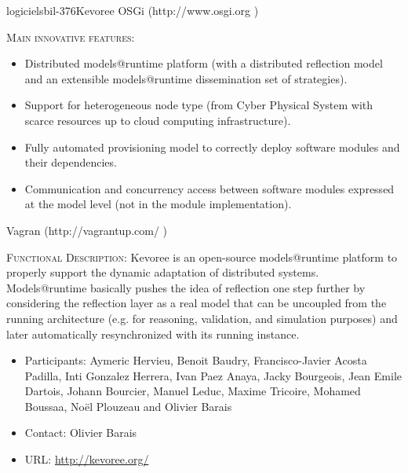\documentclass{ra2018}
\begin{document}
\begin{module}{logiciels}{bil-376}{Kevoree}
    OSGi (http://www.osgi.org )

\textsc{Main innovative features:}
\begin{itemize}
	\item Distributed models@runtime platform (with a distributed reflection model and an extensible models@runtime dissemination set of strategies).
	\item Support for heterogeneous node type (from Cyber Physical System with scarce resources up to cloud computing infrastructure).
	\item Fully automated provisioning model to correctly deploy software modules and their dependencies.
	\item Communication and concurrency access between software modules expressed at the model level (not in the module implementation).
\end{itemize}

    Vagran (http://vagrantup.com/ )


 \textsc{Functional Description:}  Kevoree is an open-source models@runtime platform to properly support the dynamic adaptation of distributed systems. Models@runtime basically pushes the idea of reflection one step further by considering the reflection layer as a real model that can be uncoupled from the running architecture (e.g. for reasoning, validation, and simulation purposes) and later automatically resynchronized with its running instance.\\

   \begin{itemize}
      \item Participants: Aymeric Hervieu, Benoit Baudry, Francisco-Javier Acosta Padilla, Inti Gonzalez Herrera, Ivan Paez Anaya, Jacky Bourgeois, Jean Emile Dartois, Johann Bourcier, Manuel Leduc, Maxime Tricoire, Mohamed Boussaa, Noël Plouzeau and Olivier Barais
      \item Contact: Olivier Barais
      \item URL: \url{http://kevoree.org/}
   \end{itemize}

 \end{module}
\end{document}
